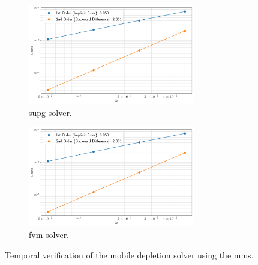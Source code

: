 \begin{figure}[H]
    \centering
    \begin{subfigure}[b]{\textwidth}
        \centering
        \includegraphics[width=0.8\textwidth]{images/verification/depletion/nuclide_mms_temp_fe.png}
        \caption{\acrshort{supg} solver.}
        \label{fig:verification:dep:temp:fe}
    \end{subfigure}
    \hfill
    \begin{subfigure}[b]{\textwidth}
        \centering
        \includegraphics[width=0.8\textwidth]{images/verification/depletion/nuclide_mms_temp_fv.png}
        \caption{\acrshort{fvm} solver.}
        \label{fig:verification:dep:temp:fv}
    \end{subfigure}
    \caption{Temporal verification of the mobile depletion solver using the \acrshort{mms}.}
    \label{fig:verification:dep:temp}
\end{figure}

